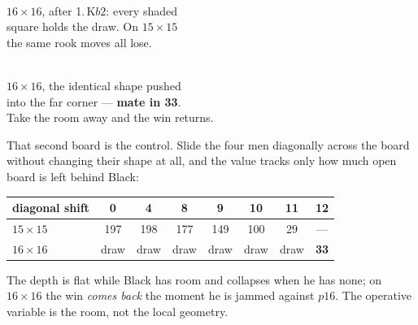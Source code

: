 \documentclass[11pt]{article}
\begin{document}
\begin{center}
\begin{minipage}[b]{0.46\textwidth}\centering
  \\[1.5mm]
  {\scriptsize\color{kqkr}$16\times16$, after 1.\,K$b2$: every shaded\\
   square holds the draw. On $15\times15$\\the same rook moves all lose.}
\end{minipage}\hfill
\begin{minipage}[b]{0.46\textwidth}\centering
  \\[1.5mm]
  {\scriptsize\color{kqkr}$16\times16$, the identical shape pushed\\
   into the far corner --- \textbf{mate in 33}.\\Take the room away and the win returns.}
\end{minipage}
\end{center}

\noindent
That second board is the control. Slide the four men diagonally across the
board without changing their shape at all, and the value tracks only how much
open board is left behind Black:

\begin{center}\small
\begin{tabular}{@{}lccccccc@{}}
\toprule
diagonal shift & 0 & 4 & 8 & 9 & 10 & 11 & 12 \\
\midrule
$15\times15$ & 197 & 198 & 177 & 149 & 100 & 29 & --- \\
$16\times16$ & draw & draw & draw & draw & draw & draw & \textbf{33} \\
\bottomrule
\end{tabular}
\end{center}

\noindent
The depth is flat while Black has room and collapses when he has none; on
$16\times16$ the win \emph{comes back} the moment he is jammed against $p16$.
The operative variable is the room, not the local geometry.
\end{document}
